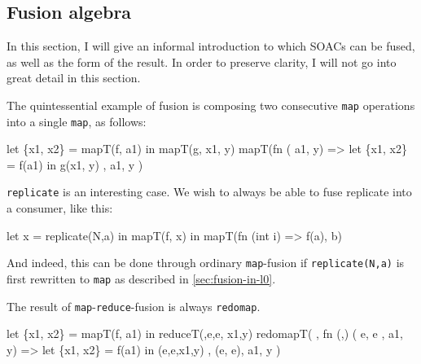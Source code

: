 \subsection{Fusion algebra}
\label{sec:fusionalgebra}

In this section, I will give an informal introduction to which SOACs
can be fused, as well as the form of the result.  In order to preserve
clarity, I will not go into great detail in this section.

The quintessential example of fusion is composing two consecutive
\texttt{map} operations into a single \texttt{map}, as follows:

\begin{center}
\begin{bcolorcode}
let \{x1, x2\} = mapT(f, a1)
in  mapT(g, x1, y)
    \emphh{\mymath{\Downarrow}}
mapT(fn \mymath{\beta} ( a1,  y) =>
      let \{x1, x2\} = f(a1)
      in  g(x1, y)
    , a1, y )
\end{bcolorcode}
\end{center}

\texttt{replicate} is an interesting case.  We wish to always be able
to fuse replicate into a consumer, like this:

\begin{center}
\begin{bcolorcode}
let x = replicate(N,a) in
mapT(f, x) in
    \emphh{\mymath{\Downarrow}}
mapT(fn  (int i) =>
       f(a), b)
\end{bcolorcode}
\end{center}

And indeed, this can be done through ordinary \texttt{map}-fusion if
\texttt{replicate(N,a)} is first rewritten to \texttt{map} as
described in \cref{sec:fusion-in-l0}.

The result of \texttt{map}-\texttt{reduce}-fusion is always
\texttt{redomap}.

\begin{center}
\begin{bcolorcode}
let \{x1, x2\} = mapT(f, a1)
in  reduceT(\mymath{\oplus},e,e, x1,y)
    \emphh{\mymath{\Downarrow}}
redomapT(\mymath{\oplus}
, fn (,) (  e,  e
             ,  a1, y)
   => let \{x1, x2\} = f(a1)
      in  \mymath{\oplus}(e,e,x1,y)
, (e, e), a1, y )
\end{bcolorcode}
\end{center}

